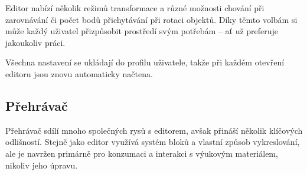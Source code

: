 Editor nabízí několik režimů transformace a různé možnosti chování při zarovnávání či počet bodů přichytávání při rotaci objektů. 
Díky těmto volbám si může každý uživatel přizpůsobit prostředí svým potřebám -- ať už preferuje jakoukoliv práci.

Všechna nastavení se ukládají do profilu uživatele, takže při každém otevření editoru jsou znovu automaticky načtena.








\subsection{Přehrávač}

Přehrávač sdílí mnoho společných rysů s editorem, avšak přináší několik klíčových odlišností. 
Stejně jako editor využívá systém bloků a vlastní způsob vykreslování, ale je navržen primárně pro konzumaci a interakci s výukovým materiálem, nikoliv jeho úpravu.

